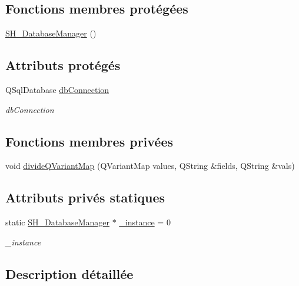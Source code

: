 \subsection*{Fonctions membres protégées}
\begin{DoxyCompactItemize}
\item 
\hyperlink{classSH__DatabaseManager_a7b5d0e372c153eb59cdab98588994904}{S\-H\-\_\-\-Database\-Manager} ()
\end{DoxyCompactItemize}
\subsection*{Attributs protégés}
\begin{DoxyCompactItemize}
\item 
Q\-Sql\-Database \hyperlink{classSH__DatabaseManager_a9291f61c3abbba2c4f1567b1d8325f0e}{db\-Connection}
\begin{DoxyCompactList}\small\item\em db\-Connection \end{DoxyCompactList}\end{DoxyCompactItemize}
\subsection*{Fonctions membres privées}
\begin{DoxyCompactItemize}
\item 
void \hyperlink{classSH__DatabaseManager_a4562e0c0027c0adbba645edc433f7fd1}{divide\-Q\-Variant\-Map} (Q\-Variant\-Map values, Q\-String \&fields, Q\-String \&vals)
\end{DoxyCompactItemize}
\subsection*{Attributs privés statiques}
\begin{DoxyCompactItemize}
\item 
static \hyperlink{classSH__DatabaseManager}{S\-H\-\_\-\-Database\-Manager} $\ast$ \hyperlink{classSH__DatabaseManager_a8ca37d0cafa6a181582d60e045a8d5ab}{\-\_\-instance} = 0
\begin{DoxyCompactList}\small\item\em \-\_\-instance \end{DoxyCompactList}\end{DoxyCompactItemize}


\subsection{Description détaillée}


